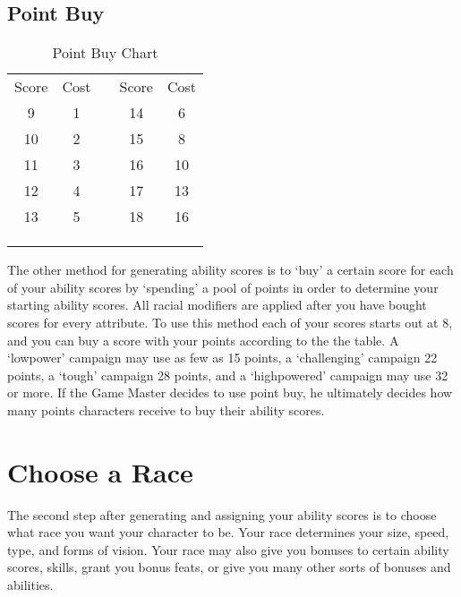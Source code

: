 \subsection{Point Buy}

\setlength{\intextsep}{-5pt}
\begin{wraptable}{O}{2in}
\caption{Point Buy Chart}
\begin{tabular}{c|c c c|c}
Score & Cost & & Score & Cost \\
9  & 1       & & 14 & 6       \\
10 & 2       & & 15 & 8       \\
11 & 3       & & 16 & 10      \\
12 & 4       & & 17 & 13      \\
13 & 5       & & 18 & 16      \\
\multicolumn{4}{c}{\cellcolor{white}}{}\\
\multicolumn{4}{c}{\cellcolor{white}}{}\\
\multicolumn{4}{c}{\cellcolor{white}}{}\\
\end{tabular}
\end{wraptable}
\setlength{\intextsep}{10pt}

The other method for generating ability scores is to `buy' a certain score for each of your ability scores by `spending' a pool of points in order to determine your starting ability scores.  All racial modifiers are applied after you have bought scores for every attribute.  To use this method each of your scores starts out at 8, and you can buy a score with your points according to the the table. A `low\textendash power' campaign may use as few as 15 points, a `challenging' campaign 22 points, a `tough' campaign 28 points, and a `high\textendash powered' campaign may use 32 or more.  If the Game Master decides to use point buy, he ultimately decides how many points characters receive to buy their ability scores.

\section{Choose a Race}

The second step after generating and assigning your ability scores is to choose what race you want your character to be.  Your race determines your size, speed, type, and forms of vision.  Your race may also give you bonuses to certain ability scores, skills, grant you bonus feats, or give you many other sorts of bonuses and abilities.

